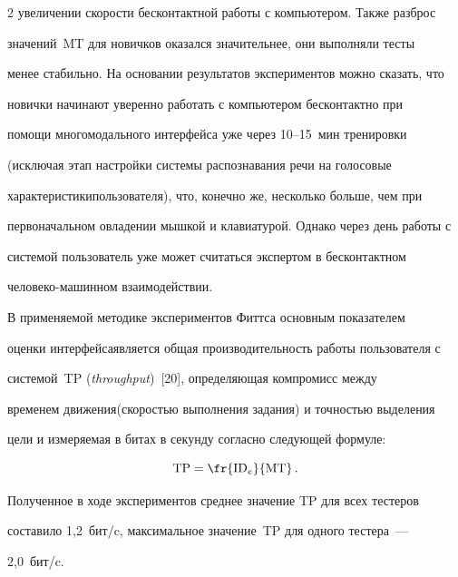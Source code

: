 \begin{multicols}{2}
увеличении скорости бесконтактной работы с компьютером. Также разброс 


значений~MT для новичков оказался значительнее, они выполняли тесты 


менее стабильно. На основании результатов экспериментов можно сказать, что 


новички начинают уверенно работать с компьютером бесконтактно при 


помощи многомодального интерфейса уже через 10--15~мин тренировки 


(исключая этап настройки системы распознавания речи на голосовые 


характеристики\linebreak пользователя), что, конечно же, несколько больше, чем при 


первоначальном овладении мышкой и клавиатурой. Однако через день работы с 


системой пользователь уже может считаться экспертом в бесконтактном 


человеко-машинном взаимодействии.








  В применяемой методике экспериментов \mbox{Фиттса} основным показателем 


оценки интерфейса\linebreak является общая производительность работы пользователя с 


системой~TP (\textit{throughput})~[20], определяющая компромисс между 


временем движения\linebreak (скоростью выполнения задания) и точностью выделения 


цели и измеряемая в битах в секунду согласно следующей формуле: 


  \begin{equation}


\mathrm{TP}=\fr{\mathrm{ID}_e}{\mathrm{MT}}\,.


  \label{e4kar}


  \end{equation}


  


  Полученное в ходе экспериментов среднее значение TP для всех тестеров 


составило 1,2~бит/c, максимальное значение~TP для одного тестера~--- 


2,0~бит/c.



\end{multicols}
